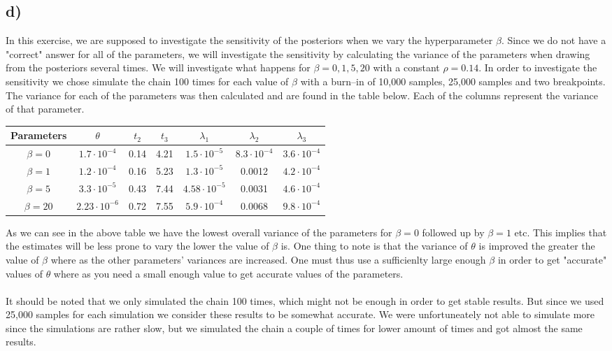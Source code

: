 \subsection*{d)}
In this exercise, we are supposed to investigate the sensitivity of the posteriors when we vary the hyperparameter $\beta$. Since we do not have a "correct" answer for all of the parameters, we will investigate the sensitivity by calculating the variance of the parameters when drawing from the posteriors several times. We will investigate what happens for $\beta = 0, 1, 5, 20$ with a constant $\rho = 0.14$. In order to investigate the sensitivity we chose simulate the chain 100 times for each value of $\beta$ with a burn--in of 10,000 samples, 25,000 samples and two breakpoints. The variance for each of the parameters was then calculated and are found in the table below. Each of the columns represent the variance of that parameter.

\begin{table}[H]
\centering
\begin{tabular}{|c|c|c|c|c|c|c|}
\hline
Parameters & $\theta$ & $t_2$ & $t_3$ & $\lambda_1$ & $\lambda_2$ & $\lambda_3$  \\ \hline
$\beta = 0$ & $1.7\cdot 10^{-4}$ & 0.14 & 4.21 & $1.5 \cdot 10^{-5}$ & $8.3 \cdot 10^{-4}$ & $3.6\cdot 10^{-4}$ \\ \hline
$\beta = 1$ & $1.2\cdot 10^{-4}$ & 0.16 & 5.23 & $1.3 \cdot 10^{-5}$ & 0.0012 & $4.2 \cdot 10^{-4}$ \\ \hline
$\beta = 5$ & $3.3 \cdot 10^{-5}$ & 0.43 & 7.44 & $4.58 \cdot 10^{-5}$ & 0.0031 & $4.6 \cdot 10^{-4}$ \\ \hline
$\beta = 20$ & $2.23 \cdot 10^{-6}$ & 0.72 & 7.55 & $5.9 \cdot 10^{-4}$ & 0.0068 & $9.8 \cdot 10^{-4}$ \\ \hline
\end{tabular}
\end{table}

As we can see in the above table we have the lowest overall variance of the parameters for $\beta = 0$ followed up by $\beta = 1$ etc. This implies that the estimates will be less prone to vary the lower the value of $\beta$ is. One thing to note is that the variance of $\theta$ is improved the greater the value of $\beta$ where as the other parameters' variances are increased. One must thus use a sufficienlty large enough $\beta$ in order to get "accurate" values of $\theta$ where as you need a small enough value to get accurate values of the parameters. \\ \\ It should be noted that we only simulated the chain 100 times, which might not be enough in order to get stable results. But since we used 25,000 samples for each simulation we consider these results to be somewhat accurate. We were unfortuneately not able to simulate more since the simulations are rather slow, but we simulated the chain a couple of times for lower amount of times and got almost the same results.

